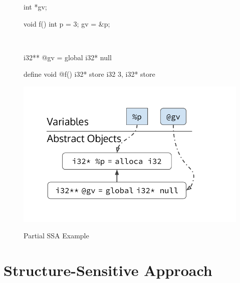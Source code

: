 \begin{figure}
  \begin{minipage}[b]{.18\linewidth}
    \captionsetup{singlelinecheck=false,justification=justified}
    \begin{cppcode}
      int *gv;

      void f()
      {
        int p = 3;
        gv = &p;
      }
    \end{cppcode}
    \label{structsens/fig/partialssa:c}
  \end{minipage}
  ~
  \begin{minipage}[b]{.4\linewidth}
    \begin{bitcode}
      i32** @gv = global i32* null

      define void @f() {
        i32* %
        store i32 3, i32* %
        store %
      }
    \end{bitcode}
    \label{structsens/fig/partialssa:llvm}
  \end{minipage}
  \begin{minipage}[b]{.33\linewidth}
    \centering
    \includegraphics[trim={14mm 10mm 0 0},clip,width=1.5\linewidth]{figures/structsens/Partial-SSA.pdf}
    \label{structsens/fig/partialssa:pt}
  \end{minipage}
  \caption{Partial SSA Example}
  \label{structsens/fig/partialssa}
\end{figure}


\section{Structure-Sensitive Approach}
\label{structsens/sect/approach}

